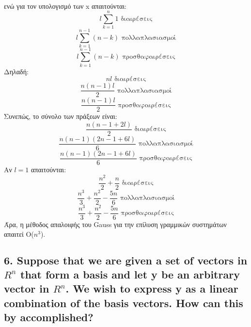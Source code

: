 \documentclass[12pt]{article}
\begin{document}
\\ ενώ για τον υπολογισμό των x απαιτούνται:
$$ l\sum_{k=1}^{n}1 \mbox{ διαιρέσεις}$$
$$ l\sum_{k=1}^{n-1}{(n-k)} \mbox{ πολλαπλασιασμοί}$$
$$ l\sum_{k=1}^{n-1}{(n-k)} \mbox{ προσθαφαιρέσεις}$$
Δηλαδή:
$$ nl \mbox{ διαιρέσεις} $$
$$ \frac{n(n-1)l}{2} \mbox{ πολλαπλασιασμοί}$$
$$ \frac{n(n-1)l}{2} \mbox{ προσθαφαιρέσεις}$$
Συνεπώς, το σύνολο των πράξεων είναι:
$$ \frac{n(n-1+2l)}{2} \mbox{ διαιρέσεις} $$
$$ \frac{n(n-1)(2n-1+6l)}{6} \mbox{ πολλαπλασιασμοί}$$
$$ \frac{n(n-1)(2n-1+6l)}{6} \mbox{ προσθαφαιρέσεις}$$
Αν $l=1$ απαιτούνται:
$$ \frac{n^2}{2} + \frac{n}{2} \mbox{ διαιρέσεις}$$
$$ \frac{n^3}{3} + \frac{n^2}{2} - \frac{5n}{6} \mbox{ πολλαπλασιασμοί}$$
$$ \frac{n^3}{3} + \frac{n^2}{2} - \frac{5n}{6} \mbox{ προσθαφαιρέσεις}$$
Άρα, η μέθοδος απαλοιφής του Gauss για την επίλυση γραμμικών συστημάτων απαιτεί Ο($n^3$).
\vspace{2in}

\pagebreak

\subsection*{6. Suppose that we are given a set of vectors in $R^n$ that form a basis and let y be an
arbitrary vector in $R^n$. We wish to express y as a linear combination of the basis vectors. How
can this by accomplished?}
\end{document}
